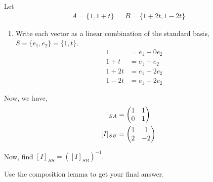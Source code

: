 \begin{example}
    Let 
    \begin{align*}
        A = \{ 1, 1 + t \} && B = \{ 1 + 2t, 1 - 2t \}
    \end{align*}

    \begin{enumerate}
        \item Write each vector as a linear combination of the standard basis, $S = \{e_1, e_2\} = \{ 1, t \}$.
        \begin{align*}
            1 &= e_1 + 0e_2 \\
            1 + t &= e_1 + e_2 \\
            1 + 2t &= e_1 + 2e_2 \\
            1 - 2t &= e_1 - 2 e_2
        \end{align*}
    \end{enumerate}

    Now, we have,
    \begin{align*}
        [I]_{SA} &=
        \begin{pmatrix}
            1 & 1 \\ 0 & 1
        \end{pmatrix} \\
        [I]_{SB} &= \vect{1 & 1 \\ 2 & -2}
    \end{align*}
    \item Now, find $[I]_{BS} = ([I]_{SB})^{-1}$.
    \item Use the composition lemma to get your final answer.
\end{example}